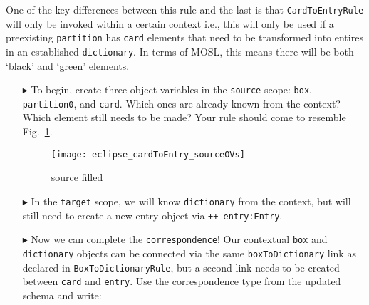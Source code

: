 One of the key differences between this rule and the last is that \texttt{CardToEntryRule} will only be invoked within a certain context i.e.,
this will only be used if a preexisting \texttt{partition} has \texttt{card} elements that need to be transformed into entires in an established
\texttt{dictionary}. In terms of MOSL, this means there will be both `black' and `green' elements.

\begin{itemize}

\item[$\blacktriangleright$] To begin, create three object variables in the \texttt{source} scope: \texttt{box}, \texttt{partition0}, and \texttt{card}. Which
ones are already known from the context? Which element still needs to be made? Your rule should come to resemble Fig.~\ref{fig:c2eRuleSource}.

\begin{figure}[htbp]
\begin{center}
  \texttt{[image: eclipse\_cardToEntry\_sourceOVs]}
  \caption{source filled}
  \label{fig:c2eRuleSource}
\end{center}
\end{figure}

\item[$\blacktriangleright$] In the \texttt{target} scope, we will know \texttt{dictionary} from the context, but will still need to create a new entry object
via \texttt{++ entry:Entry}.

\vspace{0.5cm}

\item[$\blacktriangleright$] Now we can complete the \texttt{correspondence}! Our contextual \texttt{box} and \texttt{dictionary} objects can be connected via
the same \texttt{boxToDictionary} link as declared in \texttt{BoxToDictionaryRule}, but a second link needs to be created between \texttt{card} and \texttt{entry}.
Use the correspondence type from the updated schema and write: 


\vspace{0.5cm}


\end{itemize}
